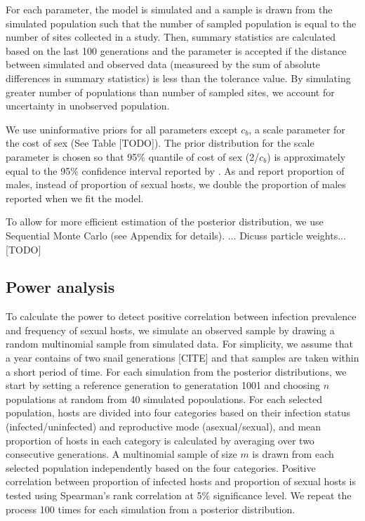 \documentclass{article}\usepackage[]{graphicx}\usepackage[]{color}
\begin{document}
For each parameter, the model is simulated and a sample is drawn from the simulated population such that the number of sampled population is equal to the number of sites collected in a study.
Then, summary statistics are calculated based on the last 100 generations and the parameter is accepted if the distance between simulated and observed data (measureed by the sum of absolute differences in summary statistics) is less than the tolerance value.
By simulating greater number of populations than number of sampled sites, we account for uncertainty in unobserved population.

We use uninformative priors for all parameters except $c_b$, a scale parameter for the cost of sex (See Table [TODO]).
The prior distribution for the scale parameter is chosen so that 95\% quantile of cost of sex (2/$c_b$) is approximately equal to the 95\% confidence interval reported by \cite{gibson2017two}.
As \cite{dagan2013clonal} and \cite{mckone2016fine} report proportion of males, instead of proportion of sexual hosts, we double the proportion of males reported when we fit the model.

To allow for more efficient estimation of the posterior distribution, we use Sequential Monte Carlo \cite{turner2012tutorial} (see Appendix for details).
...
Dicuss particle weights... [TODO]

\subsection{Power analysis}


To calculate the power to detect positive correlation between infection prevalence and frequency of sexual hosts, we simulate an observed sample by drawing a random multinomial sample from simulated data.
For simplicity, we assume that a year contains of two snail generations [CITE] and that samples are taken within a short period of time.
For each simulation from the posterior distributions, we start by setting a reference generation to generatation 1001 and choosing $n$ populations at random from 40 simulated popoulations.
For each selected population, hosts are divided into four categories based on their infection status (infected/uninfected) and reproductive mode (asexual/sexual),
and mean proportion of hosts in each category is calculated by averaging over two consecutive generations.
A multinomial sample of size $m$ is drawn from each selected population independently based on the four categories. 
Positive correlation between proportion of infected hosts and proportion of sexual hosts is tested using Spearman's rank correlation at 5\% significance level.
We repeat the process 100 times for each simulation from a posterior distribution.
\end{document}
